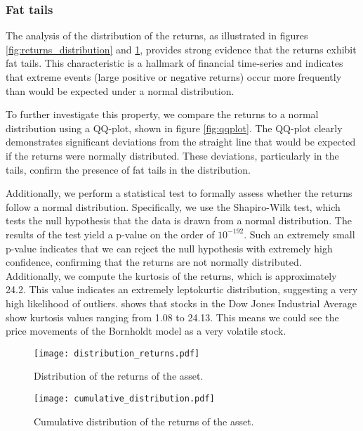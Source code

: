 \subsubsection{Fat tails}
The analysis of the distribution of the returns, as illustrated in figures \ref{fig:returns_distribution} and \ref{fig:cumulative_returns_distribution}, provides strong evidence that the returns exhibit fat tails. This characteristic is a hallmark of financial time-series and indicates that extreme events (large positive or negative returns) occur more frequently than would be expected under a normal distribution.

To further investigate this property, we compare the returns to a normal distribution using a QQ-plot, shown in figure \ref{fig:qqplot}. The QQ-plot clearly demonstrates significant deviations from the straight line that would be expected if the returns were normally distributed. These deviations, particularly in the tails, confirm the presence of fat tails in the distribution.

Additionally, we perform a statistical test to formally assess whether the returns follow a normal distribution. Specifically, we use the Shapiro-Wilk test, which tests the null hypothesis that the data is drawn from a normal distribution. The results of the test yield a p-value on the order of $10^{-192}$. Such an extremely small p-value indicates that we can reject the null hypothesis with extremely high confidence, confirming that the returns are not normally distributed. Additionally, we compute the kurtosis of the returns, which is approximately 24.2. This value indicates an extremely leptokurtic distribution, suggesting a very high likelihood of outliers. \cite{kurtosis_skewness} shows that stocks in the Dow Jones Industrial Average show kurtosis values ranging from 1.08 to 24.13. This means we could see the price movements of the Bornholdt model as a very volatile stock.

\begin{figure}[H]
    \centering
    \begin{minipage}[T]{0.45\textwidth}
        \centering
        \texttt{[image: distribution\_returns.pdf]}
        \caption{Distribution of the returns of the asset.}
        \label{fig:returns_distribution}
    \end{minipage}
    \hfill
    \begin{minipage}[T]{0.45\textwidth}
        \centering
        \texttt{[image: cumulative\_distribution.pdf]}
        \caption{Cumulative distribution of the returns of the asset.}
        \label{fig:cumulative_returns_distribution}
    \end{minipage}
\end{figure}


